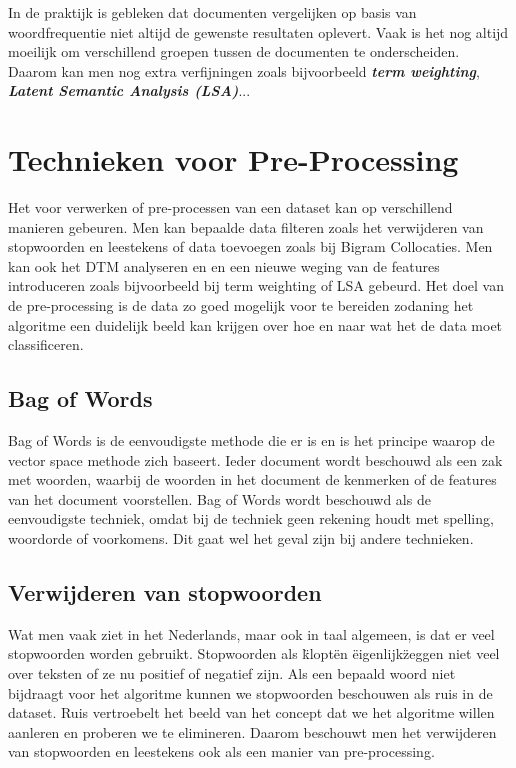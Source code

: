%
In de praktijk is gebleken dat documenten vergelijken op basis van woordfrequentie niet altijd de gewenste resultaten oplevert. Vaak is het nog altijd moeilijk om verschillend groepen tussen de documenten te onderscheiden. Daarom kan men nog extra verfijningen zoals bijvoorbeeld \textbf{\textit{term weighting}}, \textbf{\textit{Latent Semantic Analysis (LSA)}}...


\section{Technieken voor Pre-Processing}\label{Technieken voor Pre-Processing}

Het voor verwerken of pre-processen van een dataset kan op verschillend manieren gebeuren. Men kan bepaalde data filteren zoals het verwijderen van stopwoorden en leestekens of  data toevoegen zoals bij Bigram Collocaties. Men kan ook het DTM analyseren en en een nieuwe weging van de features introduceren zoals bijvoorbeeld bij term weighting of LSA gebeurd. Het doel van de pre-processing is de data zo goed mogelijk voor te bereiden zodaning het algoritme een duidelijk beeld  kan krijgen over hoe en naar wat het de data moet classificeren.

\subsection{Bag of Words}\label{Bag of Words}

Bag of Words is de eenvoudigste methode die er is en is het principe waarop de vector space methode zich baseert. Ieder document wordt beschouwd als een zak met woorden, waarbij de woorden in het document de kenmerken of de features van het document voorstellen. Bag of Words wordt beschouwd als de eenvoudigste techniek, omdat bij de techniek geen rekening houdt met spelling, woordorde of voorkomens. Dit gaat wel het geval zijn bij andere technieken.

\subsection{Verwijderen van stopwoorden}\label{Verwijderen van stopwoorden en leestekens}

Wat men vaak ziet in het Nederlands, maar ook in taal algemeen, is dat er veel stopwoorden worden gebruikt. Stopwoorden als \"klopt\" en \"eigenlijk\" zeggen niet veel over teksten of ze nu positief of negatief zijn. Als een bepaald woord niet bijdraagt voor het algoritme kunnen we stopwoorden beschouwen als ruis in de dataset. Ruis vertroebelt het beeld van het concept dat we het algoritme willen aanleren en proberen we te elimineren. Daarom beschouwt men het verwijderen van stopwoorden en leestekens ook als een manier van pre-processing.

